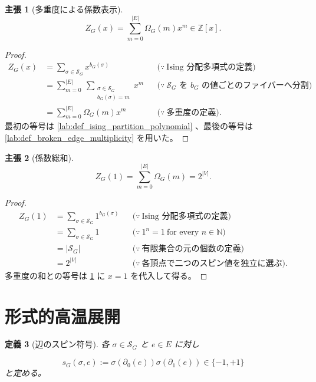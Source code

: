 \documentclass[11pt,a4paper]{article}
\newtheorem{definition}{定義}[section]
\newtheorem{claim}[definition]{主張}
\theoremstyle{remark}
\begin{document}
\begin{claim}[多重度による係数表示]\label{lab:claim_partition_polynomial_coefficient_expansion}
\[Z_G(x)=\sum_{m=0}^{|E|}\Omega_G(m)x^m\in\mathbb Z[x].\]
\end{claim}
\begin{proof}
\[\begin{aligned}
Z_G(x)
&=\sum_{\sigma\in\mathcal S_G}x^{b_G(\sigma)}
&&\bigl(\because\ \text{Ising 分配多項式の定義}\bigr)\\
&=\sum_{m=0}^{|E|}\ \sum_{\substack{\sigma\in\mathcal S_G\\ b_G(\sigma)=m}}x^m
&&\bigl(\because\ \mathcal S_G\text{ を }b_G\text{ の値ごとのファイバーへ分割}\bigr)\\
&=\sum_{m=0}^{|E|}\Omega_G(m)x^m
&&\bigl(\because\ \text{多重度の定義}\bigr).
\end{aligned}\]
最初の等号は 
\cref{lab:def_ising_partition_polynomial}
、最後の等号は 
\cref{lab:def_broken_edge_multiplicity}
 を用いた。

\end{proof}

\begin{claim}[係数総和]\label{lab:claim_partition_polynomial_value_at_one}
\[Z_G(1)=\sum_{m=0}^{|E|}\Omega_G(m)=2^{|V|}.\]
\end{claim}
\begin{proof}
\[\begin{aligned}
Z_G(1)
&=\sum_{\sigma\in\mathcal S_G}1^{b_G(\sigma)}
&&\bigl(\because\ \text{Ising 分配多項式の定義}\bigr)\\
&=\sum_{\sigma\in\mathcal S_G}1
&&\bigl(\because\ 1^n=1\ \text{for every }n\in\mathbb N\bigr)\\
&=|\mathcal S_G|
&&\bigl(\because\ \text{有限集合の元の個数の定義}\bigr)\\
&=2^{|V|}
&&\bigl(\because\ \text{各頂点で二つのスピン値を独立に選ぶ}\bigr).
\end{aligned}\]
多重度の和との等号は 
\cref{lab:claim_partition_polynomial_coefficient_expansion}
 に 
$x=1$
 を代入して得る。

\end{proof}

\part{形式的高温展開}

\begin{definition}[辺のスピン符号]\label{lab:def_edge_spin_sign}
各 
$\sigma\in\mathcal S_G$
 と 
$e\in E$
 に対し

\[s_G(\sigma,e):=\sigma(\partial_0(e))\sigma(\partial_1(e))\in\{-1,+1\}\]
と定める。

\end{definition}
\end{document}
